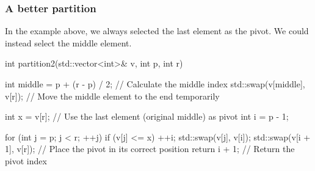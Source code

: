 \documentclass{report}
\begin{document}
\pagebreak \bigbreak \noindent 
\subsubsection{A better partition}
\bigbreak \noindent 
In the example above, we always selected the last element as the pivot. We could instead select the middle element.
\bigbreak \noindent 
\begin{cppcode}
    int partition2(std::vector<int>& v, int p, int r) {
        int middle = p + (r - p) / 2; // Calculate the middle index
        std::swap(v[middle], v[r]);   // Move the middle element to the end temporarily

        int x = v[r];                 // Use the last element (original middle) as pivot
        int i = p - 1;

        for (int j = p; j < r; ++j) {
            if (v[j] <= x) {
                ++i;
                std::swap(v[j], v[i]);
            }
        }
        std::swap(v[i + 1], v[r]);    // Place the pivot in its correct position
        return i + 1;                 // Return the pivot index
    }
\end{cppcode}

\bigbreak \noindent 
\end{document}
